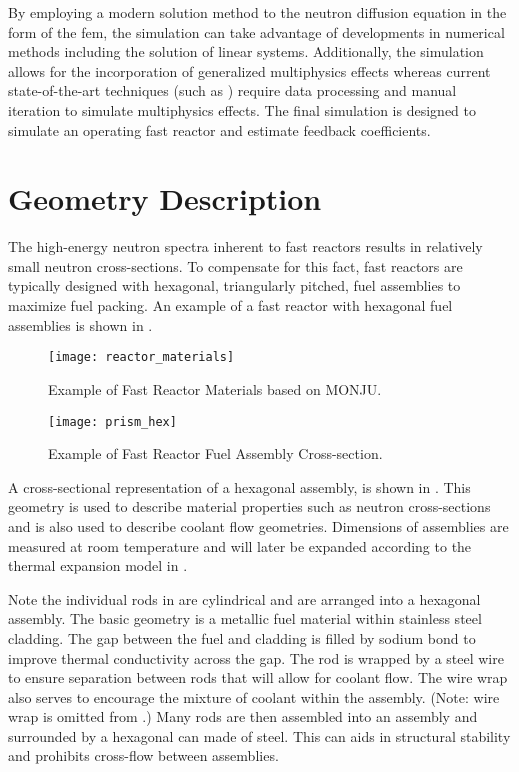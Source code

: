   By employing a modern solution method to the neutron diffusion equation in the
  form of the \gls{fem}, the simulation can take advantage of developments in
  numerical methods including the solution of linear systems.  Additionally, the
  simulation allows for the incorporation of generalized multiphysics effects
  whereas current state-of-the-art techniques (such as \dif) require data
  processing and manual iteration to simulate multiphysics effects. The final
  simulation is designed to simulate an operating fast reactor and estimate
  feedback coefficients.

\section{Geometry Description}
  \label{sec:geometry_description}
  The high-energy neutron spectra inherent to fast reactors results in
  relatively small neutron cross-sections.  To compensate for this fact, fast
  reactors are typically designed with hexagonal, triangularly pitched, fuel
  assemblies to maximize fuel packing.  An example of a fast reactor with
  hexagonal fuel assemblies is shown in .
  
  \begin{figure}
    \centering
    \texttt{[image: reactor\_materials]}
    \caption{Example of Fast Reactor Materials based on MONJU.}
    \label{fig:reactor_materials}
  \end{figure}

  \begin{figure}
    \centering
    \texttt{[image: prism\_hex]}
    \caption{Example of Fast Reactor Fuel Assembly Cross-section.}
    \label{fig:prism_hex}
  \end{figure}

  A cross-sectional representation of a hexagonal assembly, is shown in
  .  This geometry is used to describe material properties
  such as neutron cross-sections and is also used to describe coolant flow
  geometries.  Dimensions of assemblies are measured at room temperature and
  will later be expanded according to the thermal expansion model in
  .

  Note the individual rods in  are cylindrical and are
  arranged into a hexagonal assembly. The basic geometry is a metallic fuel
  material within stainless steel cladding. The gap between the fuel and
  cladding is filled by sodium bond to improve thermal conductivity across the
  gap. The rod is wrapped by a steel wire to ensure separation between rods that
  will allow for coolant flow. The wire wrap also serves to encourage the
  mixture of coolant within the assembly. (Note: wire wrap is omitted from
  .) Many rods are then assembled into an assembly and
  surrounded by a hexagonal can made of steel. This can aids in structural
  stability and prohibits cross-flow between assemblies. 

